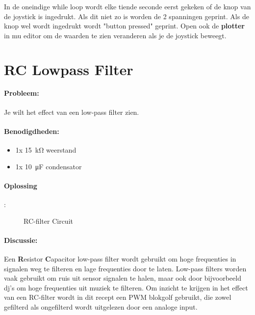 	In de oneindige while loop wordt elke tiende seconde eerst gekeken of de knop van de joystick is ingedrukt. Als dit niet zo is worden de 2 spanningen geprint. Als de knop wel wordt ingedrukt wordt "button pressed" geprint. Open ook de \textbf{plotter} in mu editor om de waarden te zien veranderen als je de joystick beweegt. 
	
	

\newpage
\section{RC Lowpass Filter}
	\paragraph{Probleem:} Je wilt het effect van een low-pass filter zien.
	\paragraph{Benodigdheden:}
	\begin{itemize}
		\item 1x \SI{15}{\kilo\ohm} weerstand
		\item 1x \SI{10}{\micro\farad} condensator
	\end{itemize}
	\paragraph{Oplossing}:
	\begin{figure}[H]
		\caption{RC-filter Circuit}
		\label{fig:PWM_Filter}
	\end{figure}
	
	\newpage
	
	\paragraph{Discussie:} Een \textbf{R}esistor \textbf{C}apacitor low-pass filter wordt gebruikt om hoge frequenties in signalen weg te filteren en lage frequenties door te laten. Low-pass filters worden vaak gebruikt om ruis uit sensor signalen te halen, maar ook door bijvoorbeeld dj's om hoge frequenties uit muziek te filteren. Om inzicht te krijgen in het effect van een RC-filter wordt in dit recept een PWM blokgolf gebruikt, die zowel gefilterd als ongefilterd wordt uitgelezen door een analoge input. \\
	
